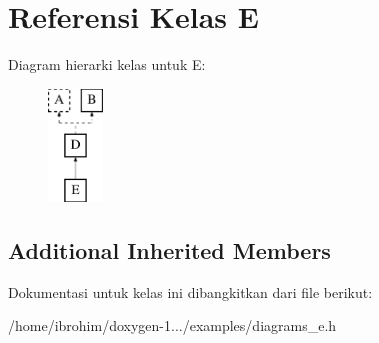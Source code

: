 \hypertarget{classE}{}\section{Referensi Kelas E}
\label{classE}
Diagram hierarki kelas untuk E\+:\begin{figure}[H]
\begin{center}
\leavevmode
\includegraphics[height=3.000000cm]{da/d5a/classE}
\end{center}
\end{figure}
\subsection*{Additional Inherited Members}


Dokumentasi untuk kelas ini dibangkitkan dari file berikut\+:\begin{DoxyCompactItemize}
\item 
/home/ibrohim/doxygen-\/1.../examples/diagrams\+\_\+e.\+h\end{DoxyCompactItemize}
